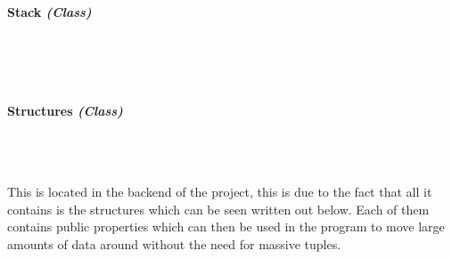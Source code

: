 \begin{FlushLeft}
    \pagebreak
\paragraph{Stack \textit{(Class)}} \mbox{} \\

    \begin{figure}[H]
        \centering
    \end{figure}\\

    \bk

    \pagebreak
\paragraph{Structures \textit{(Class)}} \mbox{} \\

    \begin{figure}[H]
        \centering
    \end{figure}\\

    This is located in the backend of the project, this is due to the fact that all it contains is the structures which can be seen written out below. Each of them contains public properties which can then be used in the program to move large amounts of data around without the need for massive tuples.


\end{FlushLeft}
